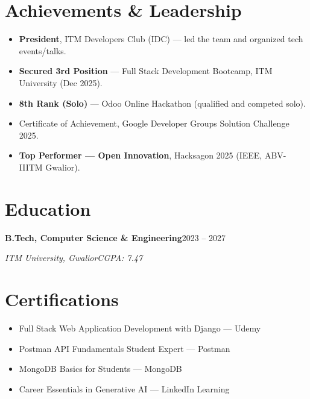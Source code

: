 \documentclass[a4paper,10pt]{article}
\newcommand{\entry}[4]{%
  \vspace{3pt}%
  \textbf{#1}\hfill #2\par
  \vspace{1pt}%
  \textit{#3}\hfill \textit{#4}\par
  \vspace{2pt}%
}
\begin{document}
\section{Achievements \& Leadership}
\begin{itemize}
  \item \textbf{President}, ITM Developers Club (IDC) --- led the team and organized tech events/talks.
  \item \textbf{Secured 3rd Position} --- Full Stack Development Bootcamp, ITM University (Dec 2025).
  \item \textbf{8th Rank (Solo)} --- Odoo Online Hackathon (qualified and competed solo).
  \item Certificate of Achievement, Google Developer Groups Solution Challenge 2025.
  \item \textbf{Top Performer --- Open Innovation}, Hacksagon 2025 (IEEE, ABV-IIITM Gwalior).
\end{itemize}

\section{Education}
\entry{B.Tech, Computer Science \& Engineering}{2023 -- 2027}{ITM University, Gwalior}{CGPA: 7.47}

\section{Certifications}
\begin{itemize}
  \item Full Stack Web Application Development with Django --- Udemy
  \item Postman API Fundamentals Student Expert --- Postman
  \item MongoDB Basics for Students --- MongoDB
  \item Career Essentials in Generative AI --- LinkedIn Learning
\end{itemize}
\end{document}
